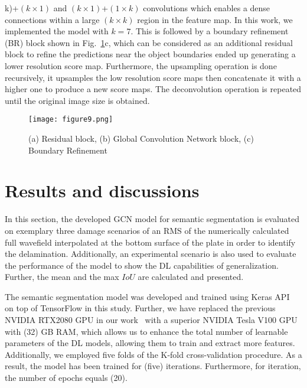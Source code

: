 \documentclass[runningheads]{llncs}
\begin{document}
k)\)+\((k\times 1)\) and \((k\times 1)\)+\((1\times k)\) convolutions which 
enables a dense connections within a large \((k\times k)\) region in the 
feature map.
In this work, we implemented the model with \(k=7\).
This is followed by a boundary refinement (BR) block shown in Fig.~\ref{fig:res_gcn_br}c, which can be considered as an additional residual block to refine the predictions near the object boundaries ended up generating a lower resolution score map. 
Furthermore, the upsampling operation is done recursively, it upsamples the low 
resolution score maps then concatenate it with a higher one to produce a new 
score maps.
The deconvolution operation is repeated until the original image size is 
obtained.
\begin{figure} [ht!]
	\begin{center}
		\texttt{[image: figure9.png]}
	\end{center}
	\caption{(a) Residual block, (b) Global Convolution Network block, (c) 
		Boundary Refinement} 
	\label{fig:res_gcn_br}
\end{figure}
\section{Results and discussions}
\label{section:results_and_discussions}
In this section, the developed GCN model for semantic segmentation is evaluated on exemplary three damage scenarios of an RMS of the numerically calculated full wavefield interpolated at the bottom surface of the plate in order to identify the delamination.
Additionally, an experimental scenario is also used to evaluate the performance of the model to show the DL capabilities of generalization.
Further, the mean and the max \(IoU\) are calculated and presented.

The semantic segmentation model was developed and trained using Keras API~\cite{chollet2015keras} on top of TensorFlow in this study.
Further, we have replaced the previous NVIDIA RTX2080 GPU in our work~\cite{Ijjeh2021} with a superior NVIDIA Tesla V100 GPU with (32) GB RAM, which allows us to enhance the total number of learnable parameters of the DL models, allowing them to train and extract more features.
Additionally, we employed five folds of the K-fold cross-validation procedure.
As a result, the model has been trained for (five) iterations.
Furthermore, for iteration, the number of epochs equals (20).
\end{document}
